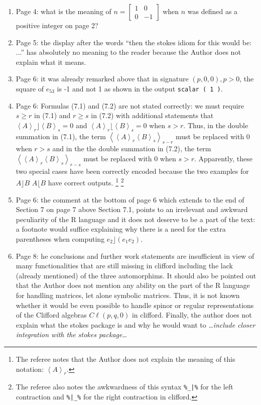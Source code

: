 \documentclass{article}
\newcommand{\cliff}[1]{\ensuremath{C\ell\left(#1\right)}}
\begin{document}
\begin{enumerate}
\item Page 4: what is the meaning of
  $n=\left[\begin{array}{cc}1&0\\0&-1\end{array}\right]$ when $n$ was
  defined as a positive integer on page 2?
  \item Page 5: the display after the words
“then the stokes idiom for this would be: ...” has absolutely no
meaning to the reader because the Author does not explain what it
means.
\item Page 6: it was already remarked above that in signature $(p, 0,
  0), p > 0$, the square of $e_{53}$ is -1 and not 1 as shown in the
  output \verb+scalar ( 1 )+.
  \item Page 6: Formulas (7.1) and (7.2) are not stated correctly: we
    must require $s\geq r$ in (7.1) and $r \geq s$ in (7.2) with
    additional statements that $\left\langle
    A\right\rangle_r\rfloor\left\langle B\right\rangle_s=0$ and
    $\left\langle A\right\rangle_r\lfloor\left\langle
    B\right\rangle_s=0$ when $s > r$.  Thus, in the double summation
    in (7.1), the term $\left\langle\left\langle
    A\right\rangle_r\left\langle B\right\rangle_s\right\rangle_{s-r}$
    must be replaced with 0 when $r > s$ and in the the double
    summation in (7.2), the term $\left\langle\left\langle
    A\right\rangle_r\left\langle B\right\rangle_s\right\rangle_{r-s}$
    must be replaced with 0 when $s>r$. Apparently, these two special
    cases have been correctly encoded because the two examples for
    $A\rfloor B$ $A\lfloor B$ have correct outputs.
\footnote{The referee notes that the Author does not explain the
meaning of this notation: $\left\langle A\right\rangle_r$.}
\footnote{The referee also notes the awkwardness of this syntax {\tt \%\_|\%} for
the left contraction and {\tt \%|\_\%} for the right
contraction in clifford.}
\item Page 6: the
    comment at the bottom of page 6 which extends to the end of
    Section 7 on page 7 above Section 7.1, points to an irrelevant and
    awkward peculiarity of the R language and it does not deserve to
    be a part of the text: a footnote would suffice explaining why
    there is a need for the extra parentheses when computing $e_2\rfloor (e_1e_2)$.
\item Page 8: he conclusions and further work statements are
  insufficient in view of many functionalities that are still missing
  in clifford including the lack (already mentioned) of the three
  automorphims.  It should also be pointed out that the Author does not
  mention any ability on the part of the R language for handling
  matrices, let alone symbolic matrices.  Thus, it is not known whether
  it would be even possible to handle spinor or regular
  representations of the Clifford algebras \cliff{p, q, 0} in
  clifford.  Finally, the author does not explain what the stokes
  package is and why he would want to \ldots{\em include closer integration
  with the stokes package}\ldots

\end{enumerate}
\end{document}
